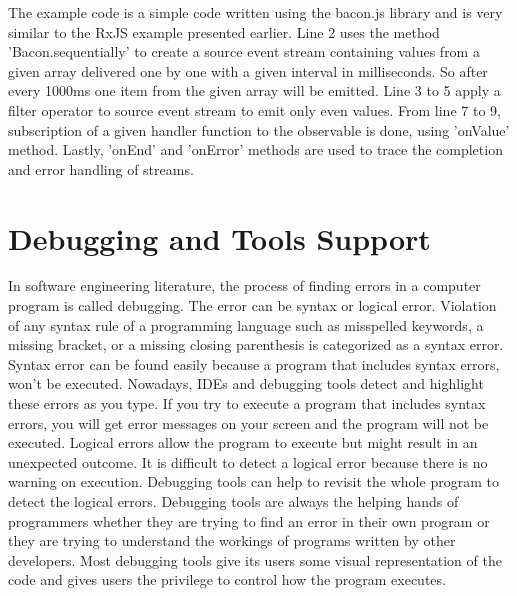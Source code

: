 The example code is a simple code written using the bacon.js library and is very similar to the RxJS example presented earlier.
Line 2 uses the method 'Bacon.sequentially' to create a source event stream containing values from a given array delivered one by one with a given interval in milliseconds. So after every 1000ms one item from the given array will be emitted. Line 3 to 5 apply a filter operator to source event stream to emit only even values. From line 7 to 9, subscription of a given handler function to the observable is done, using 'onValue' method. Lastly, 'onEnd' and 'onError' methods are used to trace the completion and error handling of streams.

\section{Debugging and Tools Support}
In software engineering literature, the process of finding errors in a computer program is called debugging. The error can be syntax or logical error. Violation of any syntax rule of a programming language such as misspelled keywords, a missing bracket, or a missing closing parenthesis is categorized as a syntax error. Syntax error can be found easily because a program that includes syntax errors, won't be executed. Nowadays, IDEs and debugging tools detect and highlight these errors as you type. If you try to execute a program that includes syntax errors, you will get error messages on your screen and the program will not be executed. Logical errors allow the program to execute but might result in an unexpected outcome.  It is difficult to detect a logical error because there is no warning on execution. Debugging tools can help to revisit the whole program to detect the logical errors.
Debugging tools are always the helping hands of programmers whether they are trying to find an error in their own program or they are trying to understand the workings of programs written by other developers. Most debugging tools give its users some visual representation of the code and gives users the privilege to control how the program executes.

